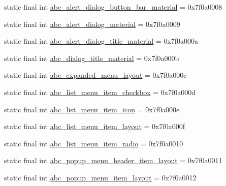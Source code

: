\begin{DoxyCompactItemize}
\item 
static final int \mbox{\hyperlink{classandroid_1_1support_1_1v7_1_1appcompat_1_1_r_1_1layout_a44d5bb70c1b1f0b37bed5a6c23b8f616}{abc\+\_\+alert\+\_\+dialog\+\_\+button\+\_\+bar\+\_\+material}} = 0x7f0a0008
\item 
static final int \mbox{\hyperlink{classandroid_1_1support_1_1v7_1_1appcompat_1_1_r_1_1layout_ad53166dc6778d14218c6ca8d20e4e365}{abc\+\_\+alert\+\_\+dialog\+\_\+material}} = 0x7f0a0009
\item 
static final int \mbox{\hyperlink{classandroid_1_1support_1_1v7_1_1appcompat_1_1_r_1_1layout_a8e6f981e6a6ee8376544f1ddf58730be}{abc\+\_\+alert\+\_\+dialog\+\_\+title\+\_\+material}} = 0x7f0a000a
\item 
static final int \mbox{\hyperlink{classandroid_1_1support_1_1v7_1_1appcompat_1_1_r_1_1layout_a12b7ab27647b0bb6ed58cf9504524932}{abc\+\_\+dialog\+\_\+title\+\_\+material}} = 0x7f0a000b
\item 
static final int \mbox{\hyperlink{classandroid_1_1support_1_1v7_1_1appcompat_1_1_r_1_1layout_a740ce0b38776f4d29c2e8813885ceb2e}{abc\+\_\+expanded\+\_\+menu\+\_\+layout}} = 0x7f0a000c
\item 
static final int \mbox{\hyperlink{classandroid_1_1support_1_1v7_1_1appcompat_1_1_r_1_1layout_a64416b615ad7fe019debb1562106f22b}{abc\+\_\+list\+\_\+menu\+\_\+item\+\_\+checkbox}} = 0x7f0a000d
\item 
static final int \mbox{\hyperlink{classandroid_1_1support_1_1v7_1_1appcompat_1_1_r_1_1layout_a11266cae66dfb288775101ecda236866}{abc\+\_\+list\+\_\+menu\+\_\+item\+\_\+icon}} = 0x7f0a000e
\item 
static final int \mbox{\hyperlink{classandroid_1_1support_1_1v7_1_1appcompat_1_1_r_1_1layout_aa5974647c5ae724bcf3b6054fcb11427}{abc\+\_\+list\+\_\+menu\+\_\+item\+\_\+layout}} = 0x7f0a000f
\item 
static final int \mbox{\hyperlink{classandroid_1_1support_1_1v7_1_1appcompat_1_1_r_1_1layout_aba244980abc5dc6fe243c8f46131de84}{abc\+\_\+list\+\_\+menu\+\_\+item\+\_\+radio}} = 0x7f0a0010
\item 
static final int \mbox{\hyperlink{classandroid_1_1support_1_1v7_1_1appcompat_1_1_r_1_1layout_abf109d49d65791b8484f93bcc52b6791}{abc\+\_\+popup\+\_\+menu\+\_\+header\+\_\+item\+\_\+layout}} = 0x7f0a0011
\item 
static final int \mbox{\hyperlink{classandroid_1_1support_1_1v7_1_1appcompat_1_1_r_1_1layout_ac9b2ae8449ac46de21fed2f9864afbc3}{abc\+\_\+popup\+\_\+menu\+\_\+item\+\_\+layout}} = 0x7f0a0012

\end{DoxyCompactItemize}
